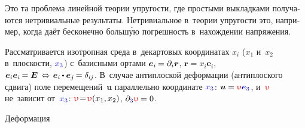 \begin{otherlanguage}{russian}

\newcommand\antiplanedisplacement{\mathcolor{red}{\upupsilon}}

Это та проблема линейной теории упругости, где простыми выкладками получаются нетривиальные результаты. Нетривиальное в~теории упругости это, например, когда  даёт бесконечно больш\'{у}ю погрешность в~нахождении напряжения.

Рассматривается изотропная среда в~декартовых координатах $x_i$ ($x_1$ и~$x_2$ в~плоскости, $\mathcolor{blue}{x_3}$) с~базисными ортами
${\bm{e}_i \hspace{-0.2ex} = \partial_i \bm{r}}$\hbox{\hspace{-0.12ex},}
${\bm{r} = x_i \bm{e}_i}$,
${\bm{e}_i \bm{e}_i \hspace{-0.2ex} = \bm{E} \,\Leftrightarrow\hspace{.25ex} \bm{e}_i \hspace{-0.1ex} \dotp \bm{e}_j \hspace{-0.2ex} = \delta_{i\hspace{-0.1ex}j}}$.
В~случае анти\-плос\-кой деформации (анти\-плос\-кого сдвига) поле перемещений~$\bm{u}$ параллельно координате $\mathcolor{blue}{x_3}$:
${\bm{u} = \antiplanedisplacement \mathcolor{blue}{\bm{e}_3}}$, и~$\antiplanedisplacement$ не~зависит от~$\mathcolor{blue}{x_3}$: ${\antiplanedisplacement \!=\! \antiplanedisplacement(x_1, x_2)}$, ${\partial_{\mathcolor{blue}{3}} \antiplanedisplacement \hspace{-0.1ex} = 0}$.

Деформация


\end{otherlanguage}
